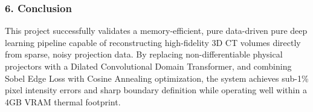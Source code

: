 \documentclass[
]{article}
\begin{document}
\subsubsection{6. Conclusion}\label{conclusion}

This project successfully validates a memory-efficient, pure data-driven
pure deep learning pipeline capable of reconstructing high-fidelity 3D
CT volumes directly from sparse, noisy projection data. By replacing
non-differentiable physical projectors with a Dilated Convolutional
Domain Transformer, and combining Sobel Edge Loss with Cosine Annealing
optimization, the system achieves sub-1\% pixel intensity errors and
sharp boundary definition while operating well within a 4GB VRAM thermal
footprint.
\end{document}
